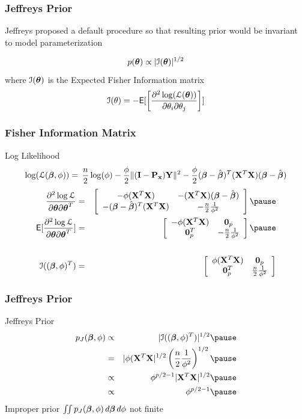 \documentclass[]{beamer}
\begin{document}
\begin{frame}
  \frametitle{Jeffreys Prior}

Jeffreys proposed a default  procedure so that resulting prior
would be invariant to model parameterization  \pause

$$p(\boldsymbol{\theta}) \propto |{\cal{I}}(\boldsymbol{\theta})|^{1/2}$$
\pause
where ${\cal{I}}(\boldsymbol{\theta})$ is the  Expected Fisher Information matrix
\pause
$$
{\cal{I}}(\theta) = - \textsf{E}[ \left[ \frac{\partial^2 \log({\cal{L}}(\boldsymbol{\theta}))}{\partial
  \theta_i \partial \theta_j} \right] ]
$$
\end{frame}
\begin{frame}
  \frametitle{Fisher Information Matrix}
Log Likelihood
$$
    \log({\cal{L}}(\boldsymbol{\beta}, \phi))  =  \, \frac{n}{2} \log(\phi)  - \frac{\phi}{2}
     \| (\mathbf{I} - \mathbf{P}_{\mathbf{x}}) \mathbf{Y}\|^2
 - \frac{\phi}{2}(\boldsymbol{\beta} - \hat{\boldsymbol{\beta}})^T(\mathbf{X}^T\mathbf{X})(\boldsymbol{\beta} - \hat{\boldsymbol{\beta}})
$$ \pause
  \begin{eqnarray*}
\frac{\partial^2 \log \cL} { \partial \tb \partial \tb^T} & = &
\left[
  \begin{array}{cc}
    -\phi (\X^T\X) & -(\X^T\X) (\b - \bhat) \\
  - (\b - \bhat)^T (\X^T\X) & -\frac{n}{2} \frac{1}{\phi^2} \\
  \end{array}
\right] \pause \\
\E[\frac{\partial^2 \log \cL} { \partial \tb \partial \tb^T}] & = &
\left[
  \begin{array}{cc}
    -\phi (\X^T\X) & \zero_p \\
  \zero_p^T & -\frac{n}{2} \frac{1}{\phi^2} \\
  \end{array}
\right] \pause \\
& & \\
\cI((\b, \phi)^T) & = & \left[
  \begin{array}{cc}
    \phi (\X^T\X) & \zero_p \\
  \zero_p^T & \frac{n}{2} \frac{1}{\phi^2}
  \end{array}
\right]
  \end{eqnarray*}
\end{frame}
\begin{frame}
  \frametitle{Jeffreys Prior}
  Jeffreys Prior
  \begin{eqnarray*}
  p_J(\b, \phi)  & \propto & |\cI((\b, \phi)^T) |^{1/2}   \pause \\
               & = & |\phi (\X^T\X|^{1/2} \left(\frac{n}{2}
                 \frac{1}{\phi^2} \right)^{1/2} \pause \\
  & \propto  &  \phi^{p/2 - 1} |\X^T\X|^{1/2} \pause \\
  & \propto & \phi^{p/2 - 1}  \pause
  \end{eqnarray*}
  Improper prior   $\iint p_J(\boldsymbol{\beta}, \phi) \, d\boldsymbol{\beta} \, d\phi $ not finite

\end{frame}
\end{document}
